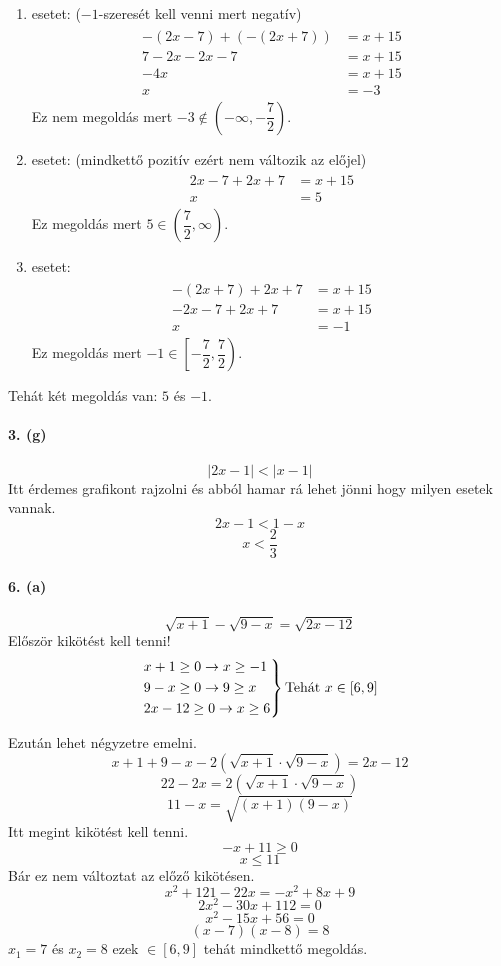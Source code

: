 \documentclass[12pt,a4paper,fleqn]{article}
\newcommand{\myparagraph}[1]{\paragraph{#1}\mbox{}}
\begin{document}
\begin{enumerate}
  \item esetet: ($-1$-szeresét kell venni mert negatív)
  \begin{align*}
    \begin{split}
      -(2x-7)+(-(2x+7)) &= x + 15 \\
      7-2x-2x-7&=x+15 \\
      -4x&=x+15 \\
      x &=-3
    \end{split}
  \end{align*}
  Ez nem megoldás mert $-3 \notin (-\infty, -\dfrac{7}{2})$.
  \item esetet: (mindkettő pozitív ezért nem változik az előjel)
  \begin{align*}
    \begin{split}
      2x-7+2x+7 &= x + 15 \\
      x &= 5
    \end{split}
  \end{align*}
  Ez megoldás mert $5 \in (\dfrac{7}{2}, \infty)$.
  \item esetet:
  \begin{align*}
    \begin{split}
      -(2x+7)+2x+7 &= x + 15 \\
      -2x-7+2x+7 &= x + 15 \\
      x &= -1
    \end{split}
  \end{align*}
  Ez megoldás mert $-1 \in \left[ -\dfrac{7}{2}, \dfrac{7}{2} \right)$.
\end{enumerate}
Tehát két megoldás van: $5$ és $-1$.


\myparagraph{3. (g)}
\[ |2x-1| < |x-1| \]
Itt érdemes grafikont rajzolni és abból hamar rá lehet jönni hogy milyen esetek vannak.
\[ 2x-1 < 1-x \]
\[ x < \dfrac{2}{3} \]


\myparagraph{6. (a)}
\[ \sqrt{x+1} - \sqrt{9-x} = \sqrt{2x-12} \]
Először kikötést kell tenni!
\[
\begin{rcases*}
  x+1 \geq 0 \rightarrow x \geq -1 \\
  9-x \geq 0 \rightarrow 9 \geq x \\
  2x-12 \geq 0 \rightarrow x \geq 6
\end{rcases*} \text{Tehát } x \in [6, 9]
\]

Ezután lehet négyzetre emelni.
\[ x+1+9-x-2(\sqrt{x+1} \cdot \sqrt{9-x}) = 2x-12 \]
\[ 22-2x = 2(\sqrt{x+1} \cdot \sqrt{9-x}) \]
\[ 11-x = \sqrt{(x+1)(9-x)} \]
Itt megint kikötést kell tenni.
\[ -x + 11 \geq 0 \]
\[ x \leq 11 \]
Bár ez nem változtat az előző kikötésen.
\[ x^2 + 121 - 22x = -x^2 + 8x + 9 \]
\[ 2x^2 -30x +112 = 0 \]
\[ x^2 -15x +56 = 0 \]
\[ (x-7)(x-8) = 8 \]
$ x_1 = 7 $ és $ x_2=8 $ ezek $\in [6,9]$ tehát mindkettő megoldás.
\end{document}
